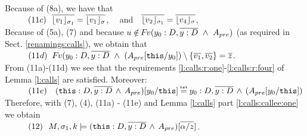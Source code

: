 \begin{description}
\\
Because of (8a), we have that \\
$\SPS (11c) \ \ \overline {\interpret {\sigma_1} {v_1} } = \overline {\interpret {\sigma} {v_1} }$, \ \ and\ \  $\overline {\interpret {\sigma_1}  {v_2} } = \overline {\interpret {\sigma} {v_4} }$,\\
Because of (5a), (7)  and because $u\notin \fv(y_0:D ,\overline {y:D}\ \wedge \  A_{pre})$ (as required in Sect. \ref{renamings:calls}), we obtain that \\
$\SPS (11d) \ \ \fv(y_0:D ,\overline {y:D}\ \wedge \  (A_{pre}[\prg{this}/y_0]) \setminus \{ \overline {v_1}, \overline {v_2} \} =  \overline z$.    
\\
From   (11a)-(11d) we see that the requirements  \ref{l:calls:r:one}-\ref{l:calls:r:four} of Lemma \ref{l:calls}  are satisfied.  Moreover: \\
$\SPS (11e) \ \ \ (\prg{this}:D,\overline{y:D}\, \wedge\, A_{pre})[y_0/\prg{this}] \txteq  y_0:D,\overline{y:D}\, \wedge\, (A_{pre}[y_0/\prg{this}] )$\\
 Therefore, with (7), (4), (11a) - (11e) and    Lemma   \ref{l:calls} part \ref{l:calls:callee:one} we obtain\\
$\SPS (12) \ \  \satDAssertFrom M  {\sigma_1} {k}   {(\prg{this}:D,\overline{y:D}\, \wedge\, A_{pre})[\overline{\alpha/z}]}$.


\end{description}
